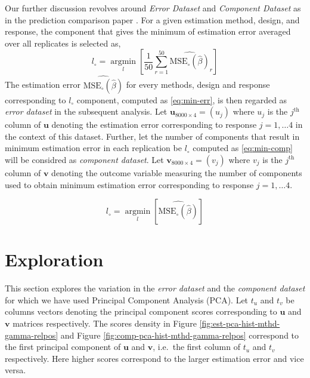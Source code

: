 \documentclass[12pt,3p,authoryear]{elsarticle}
\begin{document}
Our further discussion revolves around \emph{Error Dataset} and \emph{Component Dataset} as in the prediction comparison paper \citet{rimal2019pred}. For a given estimation method, design, and response, the component that gives the minimum of estimation error averaged over all replicates is selected as,
\begin{equation}
  l_\circ = \operatorname*{argmin}_{l}\left[\frac{1}{50}\sum_{r=1}^{50}{\widehat{\text{MSE}_\circ\left(\hat{\beta}\right)}_{r}}\right]
  \label{eq:min-err}
\end{equation}
The estimation error \(\widehat{\text{MSE}_\circ\left(\hat{\beta}\right)}\) for every methods, design and response corresponding to \(l_\circ\) component, computed as
\eqref{eq:min-err}, is then regarded as \emph{error dataset} in the subsequent
analysis. Let \(\mathbf{u}_{8000\times4}=(u_j)\) where \(u_j\) is the \(j^\text{th}\) column of \(\mathbf{u}\) denoting the estimation error corresponding to response \(j=1, \ldots 4\) in the context of this dataset. Further, let the number of components that
result in minimum estimation error in each replication be \(l_\circ\) computed as
\eqref{eq:min-comp} will be considred as \emph{component dataset}. Let
\(\mathbf{v}_{8000\times4}=(v_j)\) where \(v_j\) is the \(j^\text{th}\) column of \(\mathbf{v}\) denoting the outcome variable measuring the number of components used to obtain minimum estimation error corresponding to response \(j=1, \ldots 4\).

\begin{equation}
  l_{\circ} = \operatorname*{argmin}_{l}\left[\widehat{\text{MSE}_\circ\left(\hat{\beta}\right)}\right]
  \label{eq:min-comp}
\end{equation}

\hypertarget{exploration}{%
\section{Exploration}\label{exploration}}

This section explores the variation in the \emph{error dataset} and the \emph{component dataset} for which we have used Principal Component Analysis (PCA). Let \(t_u\) and \(t_v\) be columns vectors denoting the principal component scores corresponding to \(\mathbf{u}\) and \(\mathbf{v}\) matrices respectively. The scores density in Figure \ref{fig:est-pca-hist-mthd-gamma-relpos} and Figure \ref{fig:comp-pca-hist-mthd-gamma-relpos} correspond to the first principal component of \(\mathbf{u}\) and \(\mathbf{v}\), i.e.~the first column of \(t_u\) and \(t_v\) respectively. Here higher scores correspond to the larger estimation error and vice versa.
\end{document}
